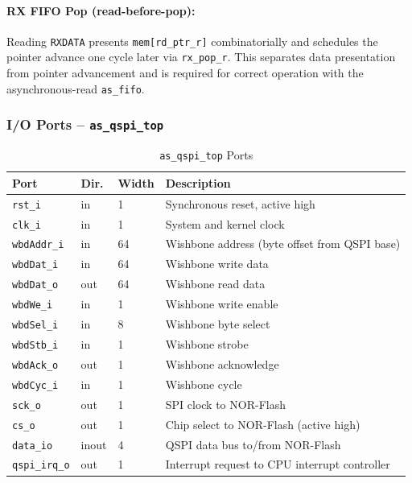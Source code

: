 \paragraph{RX FIFO Pop (read-before-pop):}
Reading \texttt{RXDATA} presents \texttt{mem[rd\_ptr\_r]} combinatorially and
schedules the pointer advance one cycle later via \texttt{rx\_pop\_r}. This
separates data presentation from pointer advancement and is required for
correct operation with the asynchronous-read \texttt{as\_fifo}.

\subsubsection{I/O Ports -- \texttt{as\_qspi\_top}}

\begin{table}[H]
\caption{\texttt{as\_qspi\_top} Ports}
\label{tab:asqspitop_ports}
\centering
\begin{tabularx}{\textwidth}{|l|l|l|X|}
  \hline
  Port & Dir. & Width & Description \\
  \hline\hline
  \texttt{rst\_i}       & in  & 1  & Synchronous reset, active high \\
  \hline
  \texttt{clk\_i}       & in  & 1  & System and kernel clock \\
  \hline
  \texttt{wbdAddr\_i}   & in  & 64 & Wishbone address (byte offset from QSPI base) \\
  \hline
  \texttt{wbdDat\_i}    & in  & 64 & Wishbone write data \\
  \hline
  \texttt{wbdDat\_o}    & out & 64 & Wishbone read data \\
  \hline
  \texttt{wbdWe\_i}     & in  & 1  & Wishbone write enable \\
  \hline
  \texttt{wbdSel\_i}    & in  & 8  & Wishbone byte select \\
  \hline
  \texttt{wbdStb\_i}    & in  & 1  & Wishbone strobe \\
  \hline
  \texttt{wbdAck\_o}    & out & 1  & Wishbone acknowledge \\
  \hline
  \texttt{wbdCyc\_i}    & in  & 1  & Wishbone cycle \\
  \hline
  \texttt{sck\_o}       & out & 1  & SPI clock to NOR-Flash \\
  \hline
  \texttt{cs\_o}        & out & 1  & Chip select to NOR-Flash (active high) \\
  \hline
  \texttt{data\_io}     & inout & 4 & QSPI data bus to/from NOR-Flash \\
  \hline
  \texttt{qspi\_irq\_o} & out & 1  & Interrupt request to CPU interrupt controller \\
  \hline
\end{tabularx}
\end{table}

